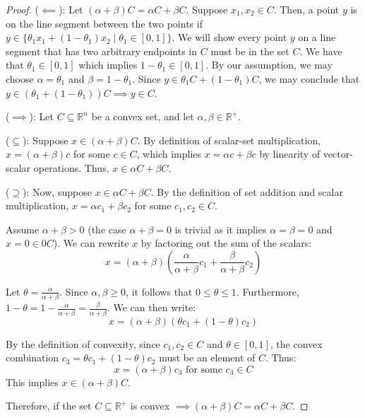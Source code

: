 \documentclass{article}
\begin{document}
\begin{proof}
($\impliedby$): Let $(\alpha +\beta) C = \alpha C + \beta C$. Suppose $x_1,x_2 \in C$. Then, a point $y$ is on the line segment between the two points if  $y \in \{\theta_1 x_1 + (1-\theta_1)x_2 \mid \theta_1 \in [0,1]\}$. We will show every point $y$ on a line segment that has two arbitrary endpoints in $C$ must be in the set $C$. We have that $\theta_1 \in [0,1]$ which implies $1-\theta_1 \in [0,1]$. By our assumption, we may choose $\alpha = \theta_1$ and $\beta = 1-\theta_1$. Since $y \in \theta_1C + (1-\theta_1)C$, we may conclude that $y \in (\theta_1 + (1-\theta_1))C \implies y \in C$.

($\implies$): Let $C \subseteq \mathbb{R}^n$ be a convex set, and let $\alpha,\beta \in \mathbb{R}^+$. 

($\subseteq$): Suppose $x \in (\alpha + \beta)C$. By definition of scalar-set multiplication, $x=(\alpha+\beta)c$ for some $c \in C$, which implies $x=\alpha c + \beta c$ by linearity of vector-scalar operations. Thus, $x \in \alpha C + \beta C$.

($\supseteq$): Now, suppose $x \in \alpha C + \beta C$. By the definition of set addition and scalar multiplication, $x = \alpha c_1 + \beta c_2$ for some $c_1, c_2 \in C$. 

Assume $\alpha + \beta > 0$ (the case $\alpha + \beta = 0$ is trivial as it implies $\alpha=\beta=0$ and $x=0 \in 0C$). We can rewrite $x$ by factoring out the sum of the scalars:
\[ x = (\alpha + \beta) \left( \frac{\alpha}{\alpha + \beta} c_1 + \frac{\beta}{\alpha + \beta} c_2 \right) \]

Let $\theta = \frac{\alpha}{\alpha + \beta}$. Since $\alpha, \beta \ge 0$, it follows that $0 \le \theta \le 1$. Furthermore, $1 - \theta = 1 - \frac{\alpha}{\alpha + \beta} = \frac{\beta}{\alpha + \beta}$. We can then write:
\[ x = (\alpha + \beta) (\theta c_1 + (1 - \theta) c_2) \]

    By the definition of convexity, since $c_1, c_2 \in C$ and $\theta \in [0, 1]$, the convex combination $c_3 = \theta c_1 + (1 - \theta) c_2$ must be an element of $C$. Thus:
\[ x = (\alpha + \beta) c_3 \text{ for some } c_3 \in C \]
This implies $x \in (\alpha + \beta)C$.

Therefore, if the set $C \subseteq \mathbb{R}^+$ is convex $\implies (\alpha + \beta)C = \alpha C + \beta C$.

\end{proof}
\end{document}
